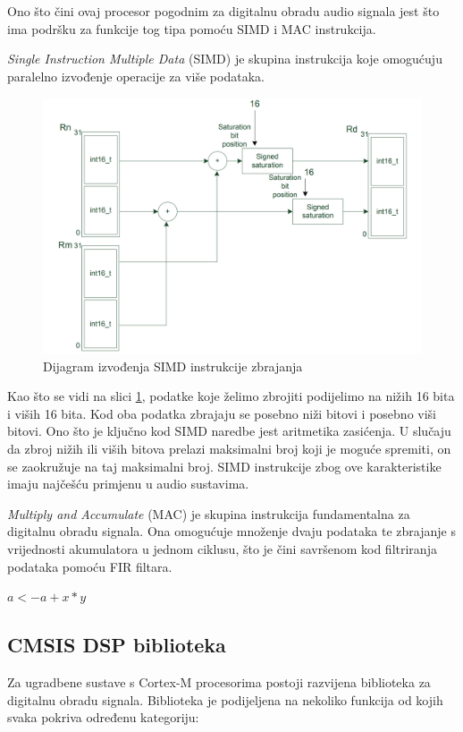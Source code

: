 \documentclass[times, utf8, diplomski]{fer}
\begin{document}
Ono što čini ovaj procesor pogodnim za digitalnu obradu audio signala jest što ima podršku za funkcije tog tipa pomoću SIMD i MAC instrukcija.

\textit{Single Instruction Multiple Data} (SIMD) je skupina instrukcija koje omogućuju paralelno izvođenje operacije za više podataka.

\begin{figure}[hbt!]
 \centering
 \includegraphics[scale=0.4]{photos/simd.png}
 \caption{Dijagram izvođenja SIMD instrukcije zbrajanja}
 \label{SIMD}
\end{figure}

Kao što se vidi na slici \ref{SIMD}, podatke koje želimo zbrojiti podijelimo na nižih 16 bita i viših 16 bita. Kod oba podatka zbrajaju se posebno niži bitovi i posebno viši bitovi. Ono što je ključno kod SIMD naredbe jest aritmetika zasićenja. U slučaju da zbroj nižih ili viših bitova prelazi maksimalni broj koji je moguće spremiti, on se zaokružuje na taj maksimalni broj. SIMD instrukcije zbog ove karakteristike imaju najčešću primjenu u audio sustavima.

\textit{Multiply and Accumulate} (MAC) je skupina instrukcija fundamentalna za digitalnu obradu signala. Ona omogućuje množenje dvaju podataka te zbrajanje s vrijednosti akumulatora u jednom ciklusu, što je čini savršenom kod filtriranja podataka pomoću FIR filtara.

$a <- a + x * y$

\subsection{CMSIS DSP biblioteka}
Za ugradbene sustave s Cortex-M procesorima postoji razvijena biblioteka za digitalnu obradu signala. Biblioteka je podijeljena na nekoliko funkcija od kojih svaka pokriva određenu kategoriju:
\end{document}
